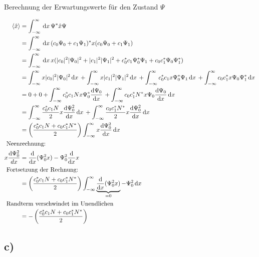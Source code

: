 Berechnung der Erwartungswerte für den Zustand $\Psi$

\begin{align}
    \langle \hat x \rangle &= \int_{-\infty}^{\infty} \,\mathrm{d}x\, \Psi^* \hat x \Psi \\
    &=\int_{-\infty}^{\infty} \,\mathrm{d}x\, (c_0 \Psi _0 + c_1 \Psi _1)^*x(c_0 \Psi _0+c_1 \Psi _1)\\
    &=\int_{-\infty}^{\infty} \,\mathrm{d}x\, x (\lvert c_0\rvert^2\lvert\Psi _0\rvert^2+\lvert c_1\rvert^2 \lvert\Psi _1\rvert^2 + c_0^* c_1 \Psi_0^*\Psi _1+c_0 c_1^* \Psi _0 \Psi _1^*)\\
    &=\int_{-\infty}^{\infty} x \lvert c_0\rvert^2 \lvert\Psi _0\rvert^2 \,\mathrm{d}x\, +\int_{-\infty}^{\infty}  
    x \lvert c_1\rvert^2 \lvert\Psi _1\rvert^2 \,\mathrm{d}x\, +\int_{-\infty}^{\infty} c_0^* c_1 x \Psi_0^*\Psi_1 \,\mathrm{d}x\,
    + \int_{-\infty}^{\infty}  c_0 c_1^*x \Psi _0 \Psi_1^* \,\mathrm{d}x\,\\
    &= 0+0+\int_{-\infty}^{\infty} c_0^*c_1 N x \Psi _0^* \frac{\mathrm{d}\Psi _0}{\mathrm{d}x} \,+\int_{-\infty}^{\infty}  c_0 c_1^* N^* x \Psi _0 \frac{\mathrm{d}\Psi _0}{\mathrm{d}x} \,\mathrm{d}x\, \\
    &= \int_{-\infty}^{\infty} \frac{c_0^*c_1N}{2}x \frac{\mathrm{d} \Psi _0^2}{\mathrm{d}x}  \,\mathrm{d}x\, +\int_{-\infty}^{\infty} \frac{c_0 c_1^* N^*}{2}x \frac{\mathrm{d}\Psi _0^2 }{\mathrm{d}x} \,\mathrm{d}x\,\\
    &=\left(\frac{c_0^* c_1 N+c_0c_1^*N^*}{2}\right)\int_{-\infty}^{\infty} x \frac{\mathrm{d}\Psi _0^2 }{\mathrm{d}x} \,\mathrm{d}x\, \\
    \intertext {
        Neenrechnung:
    }    
    x\frac{\mathrm{d}\Psi _0^2}{dx} &= \frac{\mathrm{d}}{\mathrm{d}x}(\Psi _0^2 x)-\Psi_0^2 \frac{\mathrm{d}}{\mathrm{d}x}x\\
    \intertext{
        Fortsetzung der Rechnung:
    }
    &= \left(\frac{c_0^* c_1 N+c_0c_1^*N^*}{2}\right) \int_{-\infty}^{\infty} \underbrace{\frac{\mathrm{d}}{\mathrm{d}x}(\Psi _0^2 x)}_{=0} -\Psi_0^2 \,\mathrm{d}x\, \\
    \intertext{
        Randterm verschwindet im Unendlichen
    }
    &= -\left(\frac{c_0^* c_1 N+c_0c_1^*N^*}{2}\right)
\end{align}


\subsection{c)}
 
